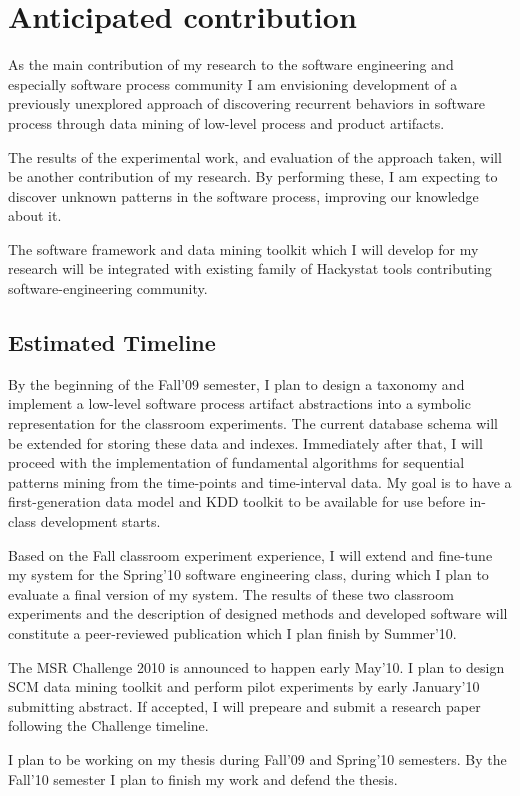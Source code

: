 \chapter{Anticipated contribution} \label{contribution}
As the main contribution of my research to the software engineering and especially software process community I am envisioning development of a previously unexplored approach of discovering recurrent behaviors in software process through data mining of low-level process and product artifacts.

The results of the experimental work, and evaluation of the approach taken, will be another contribution of my research. By performing these, I am expecting to discover unknown patterns in the software process, improving our knowledge about it.

The software framework and data mining toolkit which I will develop for my research will be integrated with existing family of Hackystat tools contributing software-engineering community.

\section{Estimated Timeline}
By the beginning of the Fall'09 semester, I plan to design a taxonomy and implement a low-level software process artifact abstractions into a symbolic representation for the classroom experiments. The current database schema will be extended for storing these data and indexes. Immediately after that, I will proceed with the implementation of fundamental algorithms for sequential patterns mining from the time-points and time-interval data. My goal is to have a first-generation data model and KDD toolkit to be available for use before in-class development starts. 

Based on the Fall classroom experiment experience, I will extend and fine-tune my system for the Spring'10 software engineering class, during which I plan to evaluate a final version of my system. The results of these two classroom experiments and the description of designed methods and developed software will constitute a peer-reviewed publication which I plan finish by Summer'10.

The MSR Challenge 2010 is announced to happen early May'10. I plan to design SCM data mining toolkit and perform pilot experiments by early January'10 submitting abstract. If accepted, I will prepeare and submit a research paper following the Challenge timeline.

I plan to be working on my thesis during Fall'09 and Spring'10 semesters.  By the Fall'10 semester I plan to finish my work and defend the thesis.
